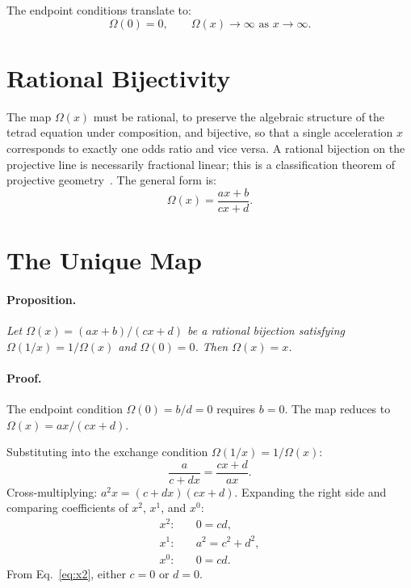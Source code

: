 \documentclass[twocolumn]{iopjournal}
\begin{document}
The endpoint conditions translate to:
\begin{equation}
  \Omega(0) = 0, \qquad \Omega(x) \to \infty
  \text{ as } x \to \infty.
  \label{eq:odds_endpoints}
\end{equation}


\section*{Rational Bijectivity}

The map $\Omega(x)$ must be rational, to preserve the algebraic
structure of the tetrad equation under composition, and bijective,
so that a single acceleration $x$ corresponds to exactly one odds
ratio and vice versa. A rational bijection on the projective line
is necessarily fractional linear; this is a classification theorem
of projective geometry~\cite{Hartshorne1977}. The general form is:
\begin{equation}
  \Omega(x) = \frac{ax + b}{cx + d}.
  \label{eq:mobius_general}
\end{equation}


\section*{The Unique Map}

\paragraph{Proposition.} \textit{Let $\Omega(x) = (ax+b)/(cx+d)$
be a rational bijection satisfying $\Omega(1/x) = 1/\Omega(x)$
and $\Omega(0) = 0$. Then $\Omega(x) = x$.}

\paragraph{Proof.}
The endpoint condition $\Omega(0) = b/d = 0$ requires $b = 0$.
The map reduces to $\Omega(x) = ax/(cx + d)$.

Substituting into the exchange condition
$\Omega(1/x) = 1/\Omega(x)$:
\begin{equation}
  \frac{a}{c + dx} = \frac{cx + d}{ax}.
  \label{eq:exchange_sub}
\end{equation}
Cross-multiplying: $a^2 x = (c + dx)(cx + d)$. Expanding
the right side and comparing coefficients of $x^2$, $x^1$,
and $x^0$:
\begin{align}
  x^2: \quad & 0 = cd, \label{eq:x2} \\
  x^1: \quad & a^2 = c^2 + d^2, \label{eq:x1} \\
  x^0: \quad & 0 = cd. \label{eq:x0}
\end{align}
From Eq.~\eqref{eq:x2}, either $c = 0$ or $d = 0$.
\end{document}
